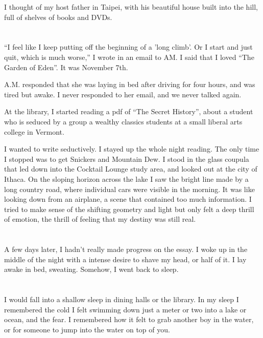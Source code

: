 I thought of my host father in Taipei, with his beautiful house built into the
hill, full of shelves of books and DVDs.  

\section{}

``I feel like I keep putting off the beginning of a 'long climb'.  Or I start
and just quit, which is much worse,'' I wrote in an email to AM.  I said that I
loved ``The Garden of Eden''.  It was November 7th. 

A.M. responded that she was laying in bed after driving for four hours, and was
tired but awake.  I never responded to her email, and we never talked again.

At the library, I started reading a pdf of ``The Secret History'', about a
student who is seduced by a group a wealthy classics students at a small liberal
arts college in Vermont.  

I wanted to write seductively.  I stayed up the whole night reading.  The only
time I stopped was to get Snickers and Mountain Dew.  I stood in the glass
coupula that led down into the Cocktail Lounge study area, and looked out at the
city of Ithaca.  On the sloping horizon across the lake I saw the bright line
made by a long country road, where individual cars were visible in the morning.
It was like looking down from an airplane, a scene that contained too much
information.  I tried to make sense of the shifting geometry and light but
only felt a deep thrill of emotion, the thrill of feeling that my destiny was
still real.

\section{}

A few days later, I hadn't really made progress on the essay.  I woke up in the
middle of the night with a intense desire to shave my head, or half of it.  I
lay awake in bed, sweating.  Somehow, I went back to sleep.

\section{}

I would fall into a shallow sleep in dining halls or the library.  In my sleep I
remembered the cold I felt swimming down just a meter or two into a lake or
ocean, and the fear.  I remembered how it felt to grab another boy in the water,
or for someone to jump into the water on top of you.  

